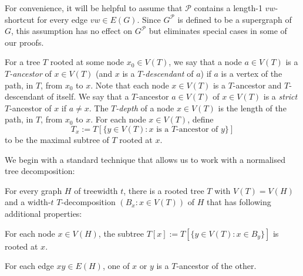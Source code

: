 \documentclass{patmorin}
\newcommand{\tlabel}[1]{\label{t:#1}}
\newcommand{\PP}{\mathcal{P}}
\renewcommand{\le}{\leqslant}
\begin{document}
For convenience, it will be helpful to assume that $\mathcal{P}$ contains a length-1 $vw$-shortcut for every edge $vw\in E(G)$.  Since $G^\PP$ is defined to be a supergraph of $G$, this assumption has no effect on $G^{\mathcal{P}}$ but eliminates special cases in some of our proofs.

For a tree $T$ rooted at some node $x_0\in V(T)$, we say that a node $a\in V(T)$ is a \emph{$T$-ancestor} of $x\in V(T)$ (and $x$ is a \emph{$T$-descendant} of $a$) if $a$ is a vertex of the path, in $T$, from $x_0$ to $x$.  Note that each node $x\in V(T)$ is a $T$-ancestor and $T$-descendant of itself.  We say that a $T$-ancestor $a\in V(T)$ of $x\in V(T)$ is a \emph{strict} $T$-ancestor of $x$ if $a\neq x$. 
The \emph{$T$-depth} of a node $x\in V(T)$ is the length of the path, in $T$, from $x_0$ to $x$.  For each node $x\in V(T)$, define
\[T_x := T[\{y\in V(T):\mbox{$x$ is a $T$-ancestor of $y$}\}] \]
to be the maximal subtree of $T$ rooted at $x$.  

We begin with a standard technique that allows us to work with a normalised tree decomposition: 

\begin{lem}
  For every graph $H$ of treewidth $t$, there is a rooted tree $T$ with $V(T)=V(H)$ and a width-$t$ $T$-decomposition $(B_x:x\in V(T))$ of $H$ that has following additional properties:  
  \begin{compactenum}[(T1)]
    \item\tlabel{subtree-root} For each node $x\in V(H)$, the subtree $T[x]:=T[\{y\in V(T):x\in B_y\}]$ is rooted at $x$.
    \item\tlabel{ancestor-edge}\tlabel{last} For each edge $xy\in E(H)$, one of $x$ or $y$ is a $T$-ancestor of the other.
  \end{compactenum}
\end{lem}
\end{document}
